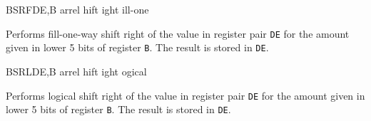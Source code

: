 \begin{basedescript}{
	\desclabelstyle{\multilinelabel}
	\desclabelwidth{3cm}}
	\begin{DetailItem}{BSRF}{DE,B\ZXN}
		{arrel hift ight ill-one}
		{\SymBSRF}

		Performs fill-one-way shift right of the value in register pair {\tt DE} for the amount given in lower 5 bits of register {\tt B}. The result is stored in {\tt DE}.

		\begin{DetailEffects}
			\FlagsBSRF
		\end{DetailEffects}
		
		\begin{DetailTiming}
			\DetailTime{2}{8}
		\end{DetailTiming}

	\end{DetailItem}


	\begin{DetailItem}{BSRL}{DE,B\ZXN}
		{arrel hift ight ogical}
		{\SymBSRL}

		Performs logical shift right of the value in register pair {\tt DE} for the amount given in lower 5 bits of register {\tt B}. The result is stored in {\tt DE}.

		\begin{DetailEffects}
			\FlagsBSRL
		\end{DetailEffects}
		
		\begin{DetailTiming}
		\end{DetailTiming}

	\end{DetailItem}




\end{basedescript}
